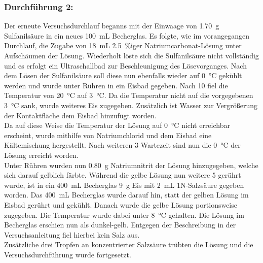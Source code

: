 \subsubsection*{Durchführung 2:}
Der erneute Versuchsdurchlauf beganns mit der Einwaage von \SI{1,70}{\gram} Sulfanilsäure in ein neues \SI{100}{\milli \liter} Becherglas. Es folgte, wie im vorangegangen Durchlauf, die Zugabe von \SI{18}{\milli \liter} \SI{2,5}{\percent}iger Natriumcarbonat-Lösung unter Aufschäumen der Lösung. Wiederholt löste sich die Sulfanilsäure nicht vollständig und es erfolgt ein Ultraschallbad zur Beschleunigung des Lösevorganges. Nach dem Lösen der Sulfanilsäure soll diese nun ebenfalls wieder auf \SI{0}{\celsius} gekühlt werden und wurde unter Rühren in ein Eisbad gegeben. Nach \SI{10}{\min} fiel die Temperatur von \SI{20}{\celsius} auf \SI{3}{\celsius}. Da die Temperatur nicht auf die vorgegebenen \SI{3}{\celsius} sank, wurde weiteres Eis zugegeben. Zusätzlich ist Wasser zur Vergrößerung der Kontaktfläche dem Eisbad hinzufügt worden.\\
\newpage
Da auf diese Weise die Temperatur der Lösung auf \SI{0}{\celsius} nicht erreichbar erscheint, wurde mithilfe von Natriumchlorid und dem Eisbad eine Kältemischung hergestellt. Nach weiteren \SI{3}{\min} Wartezeit sind nun die \SI{0}{\celsius} der Lösung erreicht worden.\\
Unter Rühren wurden nun \SI{0,80}{\gram} Natriumnitrit der Lösung hinzugegeben, welche sich darauf gelblich färbte. Während die gelbe Lösung nun weitere \SI{5}{\min} gerührt wurde, ist  in ein \SI{400}{\milli \liter} Becherglas \SI{9}{\gram} Eis mit \SI{2}{\milli \liter} 1N-Salzsäure gegeben worden. Das \SI{400}{\milli \liter} Becherglas wurde darauf hin, statt der gelben Lösung im Eisbad gerührt und gekühlt. Danach wurde die gelbe Lösung portionsweise zugegeben. Die Temperatur wurde dabei unter \SI{8}{\celsius} gehalten. Die Lösung im Becherglas erschien nun als dunkel-gelb. Entgegen der Beschreibung in der Versuchsanleitung fiel hierbei kein Salz aus.\\
Zusätzliche drei Tropfen an konzentrierter Salzsäure trübten die Lösung und die Versuchsdurchführung wurde fortgesetzt. \\

